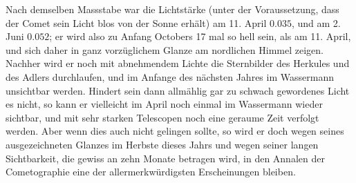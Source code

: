 \par\indent Nach demselben Massstabe war die Lichtstärke (unter der Voraussetzung, dass der Comet sein Licht blos von der Sonne erhält) am 11. April $0.035$, und am 2. Juni $0.052$; er wird also zu Anfang Octobers 17 mal so hell sein, als am 11. April, und sich daher in ganz vorzüglichem Glanze am nordlichen Himmel zeigen. Nachher wird er noch mit abnehmendem Lichte die Sternbilder des Herkules und des Adlers durchlaufen, und im Anfange des nächsten Jahres im Wassermann unsichtbar werden. Hindert sein dann allmählig gar zu schwach gewordenes Licht es nicht, so kann er vielleicht im April noch einmal im Wassermann wieder sichtbar, und mit sehr starken Telescopen noch eine geraume Zeit verfolgt werden. Aber wenn dies auch nicht gelingen sollte, so wird er doch wegen seines ausgezeichneten Glanzes im Herbste dieses Jahrs und wegen seiner langen Sichtbarkeit, die gewiss an zehn Monate betragen wird, in den Annalen der Cometographie eine der allermerkwürdigsten Erscheinungen bleiben.
